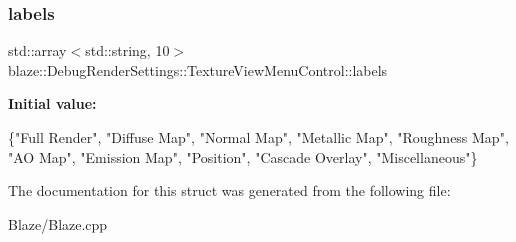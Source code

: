 \subsubsection{\texorpdfstring{labels}{labels}}
{\footnotesize\ttfamily std\+::array$<$std\+::string, 10$>$ blaze\+::\+Debug\+Render\+Settings\+::\+Texture\+View\+Menu\+Control\+::labels}

{\bfseries Initial value\+:}
\begin{DoxyCode}
\{\textcolor{stringliteral}{"Full Render"},   \textcolor{stringliteral}{"Diffuse Map"},  \textcolor{stringliteral}{"Normal Map"},   \textcolor{stringliteral}{"Metallic Map"},
                                           \textcolor{stringliteral}{"Roughness Map"},   \textcolor{stringliteral}{"AO Map"},       \textcolor{stringliteral}{"Emission Map"}, \textcolor{stringliteral}{"Position"},
                                           \textcolor{stringliteral}{"Cascade Overlay"}, \textcolor{stringliteral}{"Miscellaneous"}\}
\end{DoxyCode}


The documentation for this struct was generated from the following file\+:\begin{DoxyCompactItemize}
\item 
Blaze/Blaze.\+cpp\end{DoxyCompactItemize}
